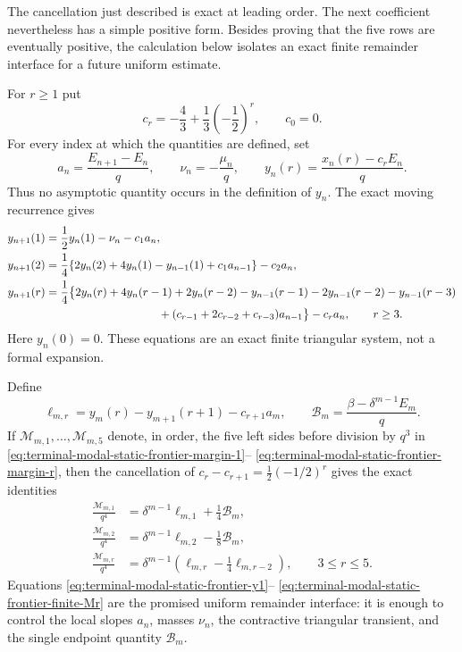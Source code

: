 The cancellation just described is exact at leading order.  The next
coefficient nevertheless has a simple positive form.  Besides proving that
the five rows are eventually positive, the calculation below isolates an
exact finite remainder interface for a future uniform estimate.

For $r\ge1$ put
\begin{equation}
 c_r=-\frac43+\frac13\left(-\frac12\right)^r,
 \qquad c_0=0.
 \label{eq:terminal-modal-static-frontier-cr}
\end{equation}
For every index at which the quantities are defined, set
\begin{equation}
 a_n=\frac{E_{n+1}-E_n}{q},\qquad
 \nu_n=-\frac{\mu_n}{q},\qquad
 y_n(r)=\frac{x_n(r)-c_rE_n}{q}.
 \label{eq:terminal-modal-static-frontier-finite-interface}
\end{equation}
Thus no asymptotic quantity occurs in the definition of $y_n$.  The exact
moving recurrence gives
\begin{align}
 y_{n+1}(1)&=\frac12y_n(1)-\nu_n-c_1a_n,
 \label{eq:terminal-modal-static-frontier-y1}\\
 y_{n+1}(2)&=\frac14\{2y_n(2)+4y_n(1)-y_{n-1}(1)
              +c_1a_{n-1}\}-c_2a_n,
 \label{eq:terminal-modal-static-frontier-y2}\\
 y_{n+1}(r)&=\frac14\bigl\{
 2y_n(r)+4y_n(r-1)+2y_n(r-2)
 -y_{n-1}(r-1)-2y_{n-1}(r-2)-y_{n-1}(r-3)\notag\\
 &\hspace{35mm}
 +(c_{r-1}+2c_{r-2}+c_{r-3})a_{n-1}\bigr\}-c_ra_n,
 \qquad r\ge3.
 \label{eq:terminal-modal-static-frontier-yr}
\end{align}
Here $y_n(0)=0$.  These equations are an exact finite triangular system, not
a formal expansion.

Define
\begin{equation}
 \ell_{m,r}=y_m(r)-y_{m+1}(r+1)-c_{r+1}a_m,
 \qquad
 \mathcal B_m=\frac{\beta-\delta^{m-1}E_m}{q}.
 \label{eq:terminal-modal-static-frontier-ellB}
\end{equation}
If $\mathcal M_{m,1},\ldots,\mathcal M_{m,5}$ denote, in order, the five
left sides before division by $q^3$ in
\eqref{eq:terminal-modal-static-frontier-margin-1}--
\eqref{eq:terminal-modal-static-frontier-margin-r}, then the cancellation of
$c_r-c_{r+1}=\frac12(-1/2)^r$ gives the exact identities
\begin{align}
 \frac{\mathcal M_{m,1}}{q^4}
 &=\delta^{m-1}\ell_{m,1}+\frac14\mathcal B_m,
 \label{eq:terminal-modal-static-frontier-finite-M1}\\
 \frac{\mathcal M_{m,2}}{q^4}
 &=\delta^{m-1}\ell_{m,2}-\frac18\mathcal B_m,
 \label{eq:terminal-modal-static-frontier-finite-M2}\\
 \frac{\mathcal M_{m,r}}{q^4}
 &=\delta^{m-1}\left(\ell_{m,r}-\frac14\ell_{m,r-2}\right),
 \qquad 3\le r\le5.
 \label{eq:terminal-modal-static-frontier-finite-Mr}
\end{align}
Equations \eqref{eq:terminal-modal-static-frontier-y1}--
\eqref{eq:terminal-modal-static-frontier-finite-Mr} are the promised uniform
remainder interface: it is enough to control the local slopes $a_n$, masses
$\nu_n$, the contractive triangular transient, and the single endpoint
quantity $\mathcal B_m$.

